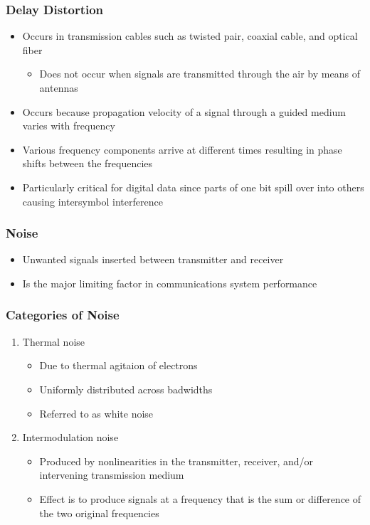 \documentclass[pdflatex,compress]{beamer}
\begin{document}
\begin{frame}
	\frametitle{Delay Distortion}
	\begin{itemize}
		\item Occurs in transmission cables such as twisted
		pair, coaxial cable, and optical fiber
		\begin{itemize}
			\item Does not occur when signals are transmitted through the air by means of antennas
		\end{itemize}
		\item Occurs because propagation velocity of a signal through a guided medium varies with frequency
		\item Various frequency components arrive at different times resulting in phase shifts between the frequencies
		\item Particularly critical for digital data since parts of one bit spill over into others causing intersymbol interference
	\end{itemize}
\end{frame}

\begin{frame}
	\frametitle{Noise}
	\begin{itemize}
		\item Unwanted signals inserted between transmitter and receiver
		\item Is the major limiting factor in communications system performance
	\end{itemize}
\end{frame}

\begin{frame}
	\frametitle{Categories of Noise}
	\begin{enumerate}
		\item Thermal noise
		\begin{itemize}
			\item Due to thermal agitaion of electrons
			\item Uniformly distributed across badwidths
			\item Referred to as white noise
		\end{itemize}
		\item Intermodulation noise
		\begin{itemize}
			\item Produced by nonlinearities in the transmitter, receiver, and/or intervening transmission medium
			\item Effect is to produce signals at a frequency that is the sum or difference of the two original frequencies
		\end{itemize}
	\end{enumerate}
\end{frame}
\end{document}
